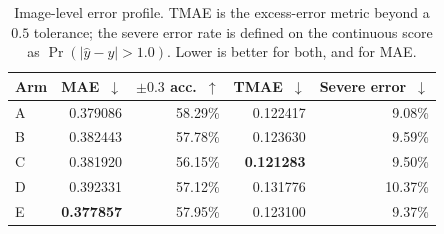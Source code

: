 \documentclass[journal]{IEEEtran}
\begin{document}
\begin{table}[!t]
\centering
\caption{Image-level error profile. TMAE is the excess-error metric beyond a
$0.5$ tolerance; the severe error rate is defined on the continuous score as
$\Pr(|\hat{y}-y| > 1.0)$. Lower is better for both, and for MAE.}
\label{tab:errprof}
\small
\begin{tabular}{@{}l rrrr@{}}
\toprule
Arm & MAE~$\downarrow$ & $\pm0.3$ acc.~$\uparrow$ & TMAE~$\downarrow$ & Severe error~$\downarrow$ \\
\midrule
A & 0.379086 & 58.29\% & 0.122417 & 9.08\% \\
B & 0.382443 & 57.78\% & 0.123630 & 9.59\% \\
C & 0.381920 & 56.15\% & \textbf{0.121283} & 9.50\% \\
D & 0.392331 & 57.12\% & 0.131776 & 10.37\% \\
E & \textbf{0.377857} & 57.95\% & 0.123100 & 9.37\% \\
\bottomrule
\end{tabular}
\end{table}
\end{document}

